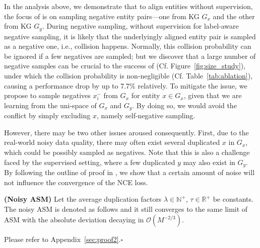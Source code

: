 In the analysis above, we demonstrate that to align entities without supervision, the focus of \solution is on sampling negative entity pairs---one from KG $G_x$ and the other from KG $G_y$. 
During negative sampling, without supervision for label-aware negative sampling, it is likely that the underlyingly aligned entity pair is sampled as a negative one, i.e., collision happens. 
Normally, this collision probability can be ignored if a few negatives are sampled; but we discover that a large number of negative samples can be crucial to the success of \solution (Cf. Figure~\ref{fig:size_study}), under which the collision probability is non-negligible (Cf. Table~\ref{tab:ablation}), causing a performance drop by up to 7.7\% relatively.
To mitigate the issue, we propose to sample negatives $x_i^-$ from ${G_x}$ for entity $x\in G_x$, given that we are learning from the uni-space of $G_x$ and $G_y$. 
By doing so, we would avoid the conflict by simply excluding $x$, namely self-negative sampling. 

However, there may be two other issues aroused consequently. 
First, due to the real-world noisy data quality, there may often exist several duplicated $x$ in $G_x$, which could be possibly sampled as negatives. 
Note that this  is also a challenge faced by the supervised  setting, where a few duplicated $y$ may also exist in $G_y$. 
By following the outline of proof in \cite{wang2020understanding},  we show that a certain amount of noise will not influence the convergence of the NCE loss. 


\begin{theorem}{\bf (Noisy ASM)} \label{th:nasm}
Let the average duplication factors $\lambda\in\mathbb{N}^+$, $\tau\in\mathbb{R}^+$ be constants. The noisy ASM is denoted as follows and it still converges to the same limit of ASM with the absolute deviation decaying in $\mathcal{O}(M^{-2/3})$.


\end{theorem}
\begin{pf}
Please refer to Appendix~\ref{sec:proof2}.\hfill$\square$
\end{pf}


